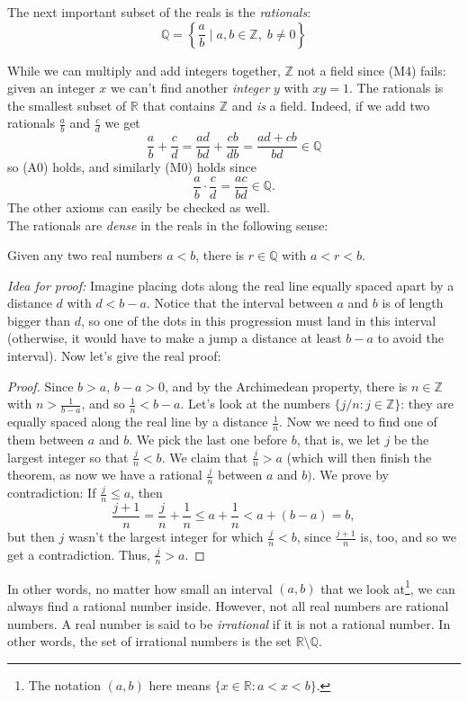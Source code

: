 \documentclass[11pt,dvipsnames]{book}
\numberwithin{figure}{section} %
\numberwithin{table}{section} %
\begin{document}
The next important subset of the reals is the {\it rationals}:
\[
\mathbb{Q} = \left\{\frac{a}{b} \;|\; a,b\in \mathbb{Z},\; b\neq 0\right\}
\]

While we can multiply and add integers together, $\mathbb{Z}$ not a field since (M4) fails: given an integer $x$ we can't find another {\it integer} $y$ with $xy=1$. The rationals is the smallest subset of $\mathbb{R}$ that contains $\mathbb{Z}$ and {\it is} a field. Indeed, if we add two rationals $\frac{a}{b}$ and $\frac{c}{d}$  we get
\[
\frac{a}{b}+\frac{c}{d} = \frac{ad}{bd}+\frac{cb}{db} = \frac{ad+cb}{bd}\in\mathbb{Q}
\]
so (A0) holds, and similarly (M0) holds since
\[
\frac{a}{b}\cdot \frac{c}{d}=\frac{ac}{bd}\in\mathbb{Q}.
\]
The other axioms can easily be checked as well.\\

The rationals are {\it dense} in the reals in the following sense: 

\begin{theorem}
Given any two real numbers $a<b$, there is $r\in\mathbb{Q}$ with $a<r<b$.
\end{theorem}

{\it Idea for proof:} Imagine placing dots along the real line equally spaced apart by a distance $d$ with $d<b-a$. Notice that the interval between $a$ and $b$ is of length bigger than $d$, so one of the dots in this progression must land in this interval (otherwise, it would have to make a jump a distance at least $b-a$ to avoid the interval). Now let's give the real proof:

\begin{proof}
Since $b>a$, $b-a>0$, and by the Archimedean property, there is $n\in  \mathbb{Z}$ with $n>\frac{1}{b-a}$, and so $\frac{1}{n}<b-a$. Let's look at the numbers $\{j/n:j\in\mathbb{Z}\}$: they are equally spaced along the real line by a distance $\frac{1}{n}$. Now we need to find one of them between $a$ and $b$. We pick the last one before $b$, that is, we let $j$ be the largest integer so that $\frac{j}{n}<b$. We claim that $\frac{j}{n}>a$ (which will then finish the theorem, as now we have a rational $\frac{j}{n}$ between $a$ and $b)$. We prove by contradiction: If $\frac{j}{n}\leq a$, then
\[
\frac{j+1}{n}=\frac{j}{n}+\frac{1}{n}\leq a+\frac{1}{n}<a+(b-a)=b,
\]
but then $j$ wasn't the largest integer for which $\frac{j}{n}<b$, since $\frac{j+1}{n}$ is, too, and so we get a contradiction. Thus, $\frac{j}{n}>a$. 
\end{proof}

In other words, no matter how small an interval $(a,b)$ that we look at\footnote{The notation $(a,b)$ here means $\{ x \in \mathbb{R} :  a < x < b\}$.}, we can always find a rational number inside. However, not all real numbers are rational numbers. A real number is said to be {\it irrational} if it is not a rational number. In other words, the set of irrational numbers is the set $\mathbb{R} \setminus \mathbb{Q}$.
\end{document}
